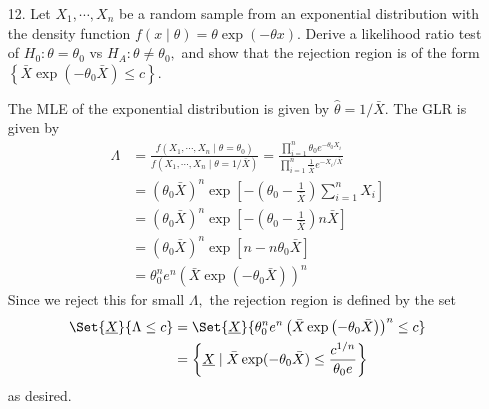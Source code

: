 \documentclass{article}
\begin{document}
\begin{itemize}
	\item[12.] Let $X_1, \cdots, X_n$ be a random sample from an exponential distribution with the density function $f(x\mid \theta)=\theta\exp(-\theta x).$ Derive a likelihood ratio test of $H_0:\theta=\theta_0$ vs $H_A:\theta\neq \theta_0,$ and show that the rejection region is of the form $\left\{ \bar{X}\exp(-\theta_0 \bar{X})\le c \right\}.$
		\begin{soln}
			The MLE of the exponential distribution is given by $\hat{\theta}=1/\bar{X}.$ The GLR is given by
			\begin{align*}
				\Lambda &= \frac{f(X_1, \cdots, X_n\mid \theta=\theta_0)}{f(X_1, \cdots, X_n\mid \theta=1/\bar{X})} = \frac{\prod_{i=1}^{n}\theta_0 e^{-\theta_0 X_i}}{\prod_{i=1}^{n}\frac{1}{\bar{X}}e^{-X_i/\bar{X}}} \\
				&= (\theta_0 \bar{X})^n \exp\left[ -\left(\theta_0-\frac{1}{\bar{X}}\right)\sum_{i=1}^{n} X_i \right] \\
				&= (\theta_0 \bar{X})^n \exp\left[ -\left( \theta_0-\frac{1}{\bar{X}}\right) n\bar{X}\right] \\
				&= (\theta_0 \bar{X})^n \exp\left[ n-n\theta_0 \bar{X} \right] \\
				&= \theta_0^n e^n \left( \bar{X} \exp\left( -\theta_0 \bar{X} \right) \right)^n
			\end{align*}
			Since we reject this for small $\Lambda,$ the rejection region is defined by the set
			\begin{align*}
				\Set{\underline{X}}{\Lambda\le c} &= \Set{\underline{X}}{\theta_0^n e^n \left( \bar{X}\exp\left( -\theta_0 \bar{X} \right) \right)^n\le c} \\
				&= \left\{ \underline{X}\mid \bar{X}\exp(-\theta_0 \bar{X}) \le \frac{c^{1/n}}{\theta_0 e}\right\} \\
			\end{align*}
			as desired.

		\end{soln}


\end{itemize}
\end{document}
